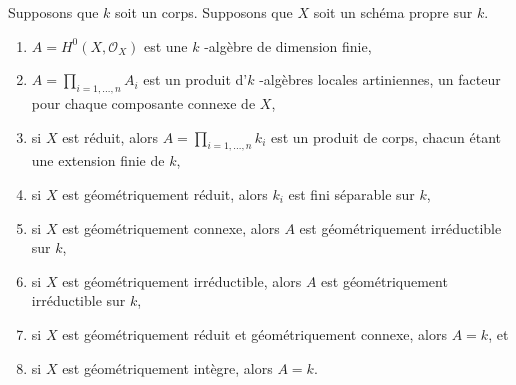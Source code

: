 \begin{lemma}
\label{lemma-proper-geometrically-reduced-global-sections}
Supposons que $k$ soit un corps. Supposons que $X$ soit un schéma propre sur $k$.
\begin{enumerate}
\item $A = H^0(X, \mathcal{O}_X)$ est une $k$ -algèbre
de dimension finie, \item $A = \prod_{i = 1, \ldots,
n} A_i$ est un produit d'$k$ -algèbres locales
artiniennes, un facteur pour chaque composante connexe
de $X$, \item si $X$ est réduit, alors $A = \prod_{i =
1, \ldots, n} k_i$ est un produit de corps, chacun
étant une extension finie de $k$, \item si $X$ est
géométriquement réduit, alors $k_i$ est fini séparable
sur $k$, \item si $X$ est géométriquement connexe, alors
$A$ est géométriquement irréductible sur $k$, \item si
$X$ est géométriquement irréductible, alors $A$ est
géométriquement irréductible sur $k$, \item si $X$ est
géométriquement réduit et géométriquement connexe, alors $A =
k$, et \item si $X$ est géométriquement intègre, alors $A = k$.
\end{enumerate}
\end{lemma}


